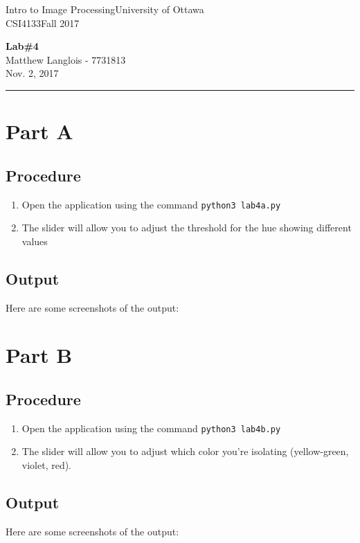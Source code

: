\documentclass[fleqn, 12pt]{article}
\newcommand{\university}{University of Ottawa}
\newcommand{\name}{Matthew Langlois}
\newcommand{\studentNumber}{7731813}
\newcommand{\semester}{Fall 2017}
\newcommand{\assignmentType}{Lab}
\newcommand{\assignemntNumber}{4}
\newcommand{\dueDate}{Nov. 2, 2017}
\newcommand{\courseCode}{CSI4133}
\newcommand{\courseTitle}{Intro to Image Processing}
\newcommand{\essayTitle}{<Title>} %
\newcommand{\essaySubtitle}{<subtitle>} %
\newcommand{\essayAbstract}{} %
\newcommand{\code}[1]{\colorbox{codegray}{\texttt{#1}}}
\newcommand{\beginassignemnt}{
    \newlength\tindent
    \setlength{\tindent}{\parindent}
    \setlength{\parindent}{0pt}
    
    \thispagestyle{assignment}
    \noindent
    \courseTitle \hfill \university\\
    \courseCode \hfill \semester
    \begin{center}
        \textbf{\assignmentType\text{ }\#\assignemntNumber}\\
        \name \hspace{1pt} - \studentNumber\\
        \dueDate\\
    \end{center}
    \vspace{6pt}
    \hrule
    \vspace{1.5\headsep}
}
\newcommand{\beginessay}{
    \nocite{*}
    
    \pagestyle{frontmatter}
    \pagenumbering{roman}
    
    \begin{center}
        \normalsize 
        \textsc{\university}\\[5cm]
        \LARGE \textbf{\MakeUppercase{\essayTitle}}\\[0.5cm]
        \large \text{ }\essaySubtitle\text{ }\\[10cm] %
        \normalsize
        \textsc{\name}\\
        \textsc{\studentNumber}\\ 
        \textsc{\courseCode}\\
        \textsc{\semester}\\
        \textsc{\dueDate}
    \end{center}
    \thispagestyle{empty}
    
    \newpage
    \tableofcontents
    \newpage
    
    \iftotalfigures
        \addcontentsline{toc}{section}{\listfigurename}
        \listoffigures
    \fi
    \iftotaltables
        \addcontentsline{toc}{section}{\listtablename}
        \listoftables
    \fi
    
    \ifdefempty{\essayAbstract}{}{
        \newpage
        \addcontentsline{toc}{section}{Abstract}
        \begin{abstract}
            \essayAbstract
        \end{abstract}
        
    }
    \label{EndFrontMatter}
    \newpage
    
    \pagenumbering{arabic}
    \pagestyle{body}
}
\begin{document}
\beginassignemnt

\section*{Part A}

\subsection*{Procedure}
\begin{enumerate}[1)]
    \item Open the application using the command \code{python3 lab4a.py}
    \item The slider will allow you to adjust the threshold for the hue showing different values
\end{enumerate}

\subsection*{Output}

Here are some screenshots of the output:


\section*{Part B}

\subsection*{Procedure}
\begin{enumerate}[1)]
    \item Open the application using the command \code{python3 lab4b.py}
    \item The slider will allow you to adjust which color you're isolating (yellow-green, violet, red).
\end{enumerate}

\subsection*{Output}

Here are some screenshots of the output:

\end{document}
